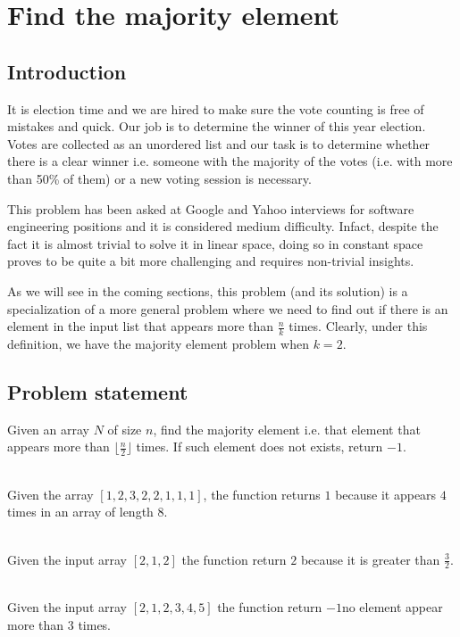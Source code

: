 %

\chapter{Find the majority element}
\label{ch:majority_element}
\section*{Introduction}
It is election time and we are hired to make sure the vote counting is free of mistakes and quick. 
Our job is to determine the winner of this year election. 
Votes are collected as an unordered list and our task is to determine whether there is a clear winner i.e. someone with the majority of the votes (i.e. with more than 50\% of them) or
a new voting session is necessary. 

This problem has been asked at Google and Yahoo interviews for software engineering positions and it is considered medium difficulty. 
Infact, despite the fact it is almost trivial to solve it in linear space, doing so in constant space proves to be quite a bit more challenging and requires non-trivial insights.

As we will see in the coming sections, this problem (and its solution) is a specialization of a more general problem where we need to find out if there is an element in the input list that appears more than $\frac{n}{k}$ times. Clearly, under this definition, we have the majority element problem when $k=2$.
\section{Problem statement}
\begin{exercise}
Given an array $N$ of size $n$, find the majority element i.e. that element that appears more than $\lfloor \frac{n}{2} \rfloor$ times.
If such element does not exists, return $-1$.
	\begin{example}
		\hfill \\
		Given the array $[1,2,3,2,2,1,1,1]$, the function returns $1$ because it appears $4$ times in an array of length $8$.
	
	\end{example}

	\begin{example}
		\hfill \\
		Given the input array $[2, 1, 2]$ the function return $2$ because it is greater than $\frac{3}{2}$.
		
	\end{example}

	\begin{example}
		\hfill \\
		Given the input array $[2, 1, 2,3,4,5]$ the function return $-1$no element appear more than $3$ times.
		
	\end{example}

\end{exercise}

